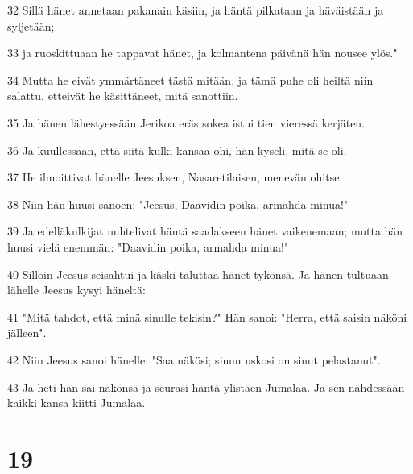 \par 32 Sillä hänet annetaan pakanain käsiin, ja häntä pilkataan ja häväistään ja syljetään;
\par 33 ja ruoskittuaan he tappavat hänet, ja kolmantena päivänä hän nousee ylös."
\par 34 Mutta he eivät ymmärtäneet tästä mitään, ja tämä puhe oli heiltä niin salattu, etteivät he käsittäneet, mitä sanottiin.
\par 35 Ja hänen lähestyessään Jerikoa eräs sokea istui tien vieressä kerjäten.
\par 36 Ja kuullessaan, että siitä kulki kansaa ohi, hän kyseli, mitä se oli.
\par 37 He ilmoittivat hänelle Jeesuksen, Nasaretilaisen, menevän ohitse.
\par 38 Niin hän huusi sanoen: "Jeesus, Daavidin poika, armahda minua!"
\par 39 Ja edelläkulkijat nuhtelivat häntä saadakseen hänet vaikenemaan; mutta hän huusi vielä enemmän: "Daavidin poika, armahda minua!"
\par 40 Silloin Jeesus seisahtui ja käski taluttaa hänet tykönsä. Ja hänen tultuaan lähelle Jeesus kysyi häneltä:
\par 41 "Mitä tahdot, että minä sinulle tekisin?" Hän sanoi: "Herra, että saisin näköni jälleen".
\par 42 Niin Jeesus sanoi hänelle: "Saa näkösi; sinun uskosi on sinut pelastanut".
\par 43 Ja heti hän sai näkönsä ja seurasi häntä ylistäen Jumalaa. Ja sen nähdessään kaikki kansa kiitti Jumalaa.

\chapter{19}

